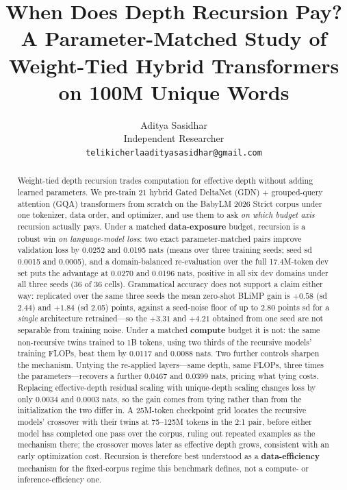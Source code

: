 \documentclass[11pt]{article}
\title{When Does Depth Recursion Pay? A Parameter-Matched Study of\\Weight-Tied Hybrid Transformers on 100M Unique Words}
\author{Aditya Sasidhar \\
  Independent Researcher \\
  \texttt{telikicherlaadityasasidhar@gmail.com}}
\begin{document}
\maketitle

\begin{abstract}
Weight-tied depth recursion trades computation for effective depth without adding learned parameters. We pre-train 21 hybrid Gated DeltaNet (GDN) + grouped-query attention (GQA) transformers from scratch on the BabyLM 2026 Strict corpus under one tokenizer, data order, and optimizer, and use them to ask \emph{on which budget axis} recursion actually pays. Under a matched \textbf{data-exposure} budget, recursion is a robust win \emph{on language-model loss}: two exact parameter-matched pairs improve validation loss by 0.0252 and 0.0195 nats (means over three training seeds; seed sd 0.0015 and 0.0005), and a domain-balanced re-evaluation over the full 17.4M-token dev set puts the advantage at 0.0270 and 0.0196 nats, positive in all six dev domains under all three seeds (36 of 36 cells). Grammatical accuracy does not support a claim either way: replicated over the same three seeds the mean zero-shot BLiMP gain is $+0.58$ (sd 2.44) and $+1.84$ (sd 2.05) points, against a seed-noise floor of up to 2.80 points sd for a \emph{single} architecture retrained---so the $+3.31$ and $+4.21$ obtained from one seed are not separable from training noise. Under a matched \textbf{compute} budget it is not: the same non-recursive twins trained to 1B tokens, using two thirds of the recursive models' training FLOPs, beat them by 0.0117 and 0.0088 nats. Two further controls sharpen the mechanism. Untying the re-applied layers---same depth, same FLOPs, three times the parameters---recovers a further 0.0467 and 0.0399 nats, pricing what tying costs. Replacing effective-depth residual scaling with unique-depth scaling changes loss by only 0.0034 and 0.0003 nats, so the gain comes from tying rather than from the initialization the two differ in. A 25M-token checkpoint grid locates the recursive models' crossover with their twins at 75--125M tokens in the 2:1 pair, before either model has completed one pass over the corpus, ruling out repeated examples as the mechanism there; the crossover moves later as effective depth grows, consistent with an early optimization cost. Recursion is therefore best understood as a \textbf{data-efficiency} mechanism for the fixed-corpus regime this benchmark defines, not a compute- or inference-efficiency one.
\end{abstract}
\end{document}
